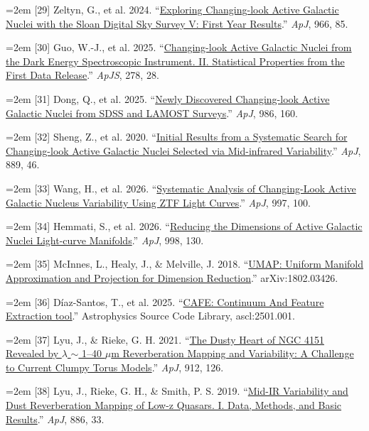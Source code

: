 \documentclass[12pt]{article}
\begin{document}
\noindent\hangindent=2em [29] Zeltyn, G., et al. 2024. ``\href{https://doi.org/10.3847/1538-4357/ad2f30}{Exploring Changing-look Active Galactic Nuclei with the Sloan Digital Sky Survey V: First Year Results}.'' \emph{ApJ}, 966, 85.\par
\noindent\hangindent=2em [30] Guo, W.-J., et al. 2025. ``\href{https://doi.org/10.3847/1538-4365/adc124}{Changing-look Active Galactic Nuclei from the Dark Energy Spectroscopic Instrument. II. Statistical Properties from the First Data Release}.'' \emph{ApJS}, 278, 28.\par
\noindent\hangindent=2em [31] Dong, Q., et al. 2025. ``\href{https://arxiv.org/abs/2408.07335}{Newly Discovered Changing-look Active Galactic Nuclei from SDSS and LAMOST Surveys}.'' \emph{ApJ}, 986, 160.\par
\noindent\hangindent=2em [32] Sheng, Z., et al. 2020. ``\href{https://doi.org/10.3847/1538-4357/ab5af9}{Initial Results from a Systematic Search for Changing-look Active Galactic Nuclei Selected via Mid-infrared Variability}.'' \emph{ApJ}, 889, 46.\par
\noindent\hangindent=2em [33] Wang, H., et al. 2026. ``\href{https://doi.org/10.3847/1538-4357/ae1fdc}{Systematic Analysis of Changing-Look Active Galactic Nucleus Variability Using ZTF Light Curves}.'' \emph{ApJ}, 997, 100.\par
\noindent\hangindent=2em [34] Hemmati, S., et al. 2026. ``\href{https://doi.org/10.3847/1538-4357/ae38b8}{Reducing the Dimensions of Active Galactic Nuclei Light-curve Manifolds}.'' \emph{ApJ}, 998, 130.\par
\noindent\hangindent=2em [35] McInnes, L., Healy, J., \& Melville, J. 2018. ``\href{https://arxiv.org/abs/1802.03426}{UMAP: Uniform Manifold Approximation and Projection for Dimension Reduction}.'' arXiv:1802.03426.\par
\noindent\hangindent=2em [36] D\'iaz-Santos, T., et al. 2025. ``\href{https://ascl.net/2501.001}{CAFE: Continuum And Feature Extraction tool}.'' Astrophysics Source Code Library, ascl:2501.001.\par
\noindent\hangindent=2em [37] Lyu, J., \& Rieke, G. H. 2021. ``\href{https://doi.org/10.3847/1538-4357/abee14}{The Dusty Heart of NGC 4151 Revealed by $\lambda$ $\sim$ 1--40 $\mu$m Reverberation Mapping and Variability: A Challenge to Current Clumpy Torus Models}.'' \emph{ApJ}, 912, 126.\par
\noindent\hangindent=2em [38] Lyu, J., Rieke, G. H., \& Smith, P. S. 2019. ``\href{https://doi.org/10.3847/1538-4357/ab481d}{Mid-IR Variability and Dust Reverberation Mapping of Low-z Quasars. I. Data, Methods, and Basic Results}.'' \emph{ApJ}, 886, 33.\par
\end{document}

